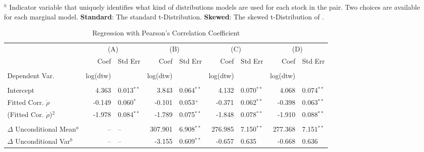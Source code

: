 \begin{table}
\begin{tablenotes}
        \item {$^{h}$ Indicator variable that uniquely identifies what kind of distributions models are used for each stock in the pair. Two choices are available for each marginal model. \textbf{Standard}: The standard t-Distribution. \textbf{Skewed}: The skewed t-Distribution of \cite{Fernandez_Steel_1998}.}
    \end{tablenotes}
    \label{tbl:correlation_to_log_dtw_regression}
\end{table}


\begin{table}
    \fontsize{8pt}{8pt}\selectfont
    \caption{Regression with Pearson's Correlation Coefficient}
    \centering
    \begin{tabular}{l r l r l r l r l}
        \midrule
        & \multicolumn{2}{c}{(A)} & \multicolumn{2}{c}{(B)} & \multicolumn{2}{c}{(C)} & \multicolumn{2}{c}{(D)}  \\
         & Coef & Std Err & Coef & Std Err & Coef & Std Err & Coef & Std Err  \\
        \midrule
                                                                                                                                                 \\
        Dependent Var.                     & log(dtw)&              & log(dtw)&               & log(dtw)&              & log(dtw)&               \\
                                                                                                                                                 \\
        Intercept                          &  4.363 & 0.013$^{**}$  &   3.843 & 0.064$^{**}$ &   4.132 & 0.070$^{**}$  &   4.068 & 0.074$^{**}$  \\
        Fitted Corr. $\dot{\rho}$          & -0.149 & 0.060$^{*}$   &  -0.101 & 0.053$^{+}$  &  -0.371 & 0.062$^{**}$  &  -0.398 & 0.063$^{**}$  \\
        (Fitted Cor. $\dot{\rho}$)$^{2}$   & -1.978 & 0.084$^{**}$  &  -1.789 & 0.075$^{**}$ &  -1.848 & 0.078$^{**}$  &  -1.910 & 0.088$^{**}$  \\  \\
        $\Delta$ Unconditional Mean$^{a}$  &     -- & --            & 307.901 & 6.908$^{**}$ & 276.985 & 7.150$^{**}$  & 277.368 & 7.151$^{**}$  \\
        $\Delta$ Unconditional Var$^{b}$   &     -- & --            &  -3.155 & 0.609$^{**}$ &  -0.657 & 0.635         &  -0.668 & 0.636         \\

\end{tabular}
\end{table}
